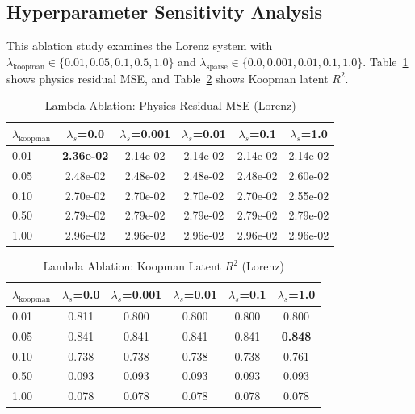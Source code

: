 \documentclass{article}
\theoremstyle{remark}
\begin{document}
\subsection{Hyperparameter Sensitivity Analysis}

This ablation study examines the Lorenz system with $\lambda_\text{koopman} \in \{0.01, 0.05, 0.1, 0.5, 1.0\}$ and $\lambda_\text{sparse} \in \{0.0, 0.001, 0.01, 0.1, 1.0\}$. Table~\ref{tab:lambda_ablation_residual} shows physics residual MSE, and Table~\ref{tab:lambda_ablation_r2} shows Koopman latent $R^2$.

\begin{table}[H]
\centering
\caption{Lambda Ablation: Physics Residual MSE (Lorenz)}
\label{tab:lambda_ablation_residual}
\begin{tabular}{lccccc}
\toprule
$\lambda_\text{koopman}$ & $\lambda_s$=0.0 & $\lambda_s$=0.001 & $\lambda_s$=0.01 & $\lambda_s$=0.1 & $\lambda_s$=1.0 \\
\midrule
0.01 & \textbf{2.36e-02} & 2.14e-02 & 2.14e-02 & 2.14e-02 & 2.14e-02 \\
0.05 & 2.48e-02 & 2.48e-02 & 2.48e-02 & 2.48e-02 & 2.60e-02 \\
0.10 & 2.70e-02 & 2.70e-02 & 2.70e-02 & 2.70e-02 & 2.55e-02 \\
0.50 & 2.79e-02 & 2.79e-02 & 2.79e-02 & 2.79e-02 & 2.79e-02 \\
1.00 & 2.96e-02 & 2.96e-02 & 2.96e-02 & 2.96e-02 & 2.96e-02 \\
\bottomrule
\end{tabular}
\end{table}

\begin{table}[H]
\centering
\caption{Lambda Ablation: Koopman Latent $R^2$ (Lorenz)}
\label{tab:lambda_ablation_r2}
\begin{tabular}{lccccc}
\toprule
$\lambda_\text{koopman}$ & $\lambda_s$=0.0 & $\lambda_s$=0.001 & $\lambda_s$=0.01 & $\lambda_s$=0.1 & $\lambda_s$=1.0 \\
\midrule
0.01 & 0.811 & 0.800 & 0.800 & 0.800 & 0.800 \\
0.05 & 0.841 & 0.841 & 0.841 & 0.841 & \textbf{0.848} \\
0.10 & 0.738 & 0.738 & 0.738 & 0.738 & 0.761 \\
0.50 & 0.093 & 0.093 & 0.093 & 0.093 & 0.093 \\
1.00 & 0.078 & 0.078 & 0.078 & 0.078 & 0.078 \\
\bottomrule
\end{tabular}
\end{table}
\end{document}
